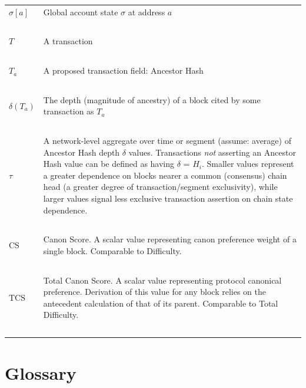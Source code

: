 \documentclass[11pt]{article}
\theoremstyle{plain}
\begin{document}
\begin{table}[H]
{\begin{tabular}{|p{5cm}|p{9cm}|}
$\sigma[a]$ & Global account state $\sigma$ at address $a$ \\~\\

$T$ & A transaction \\~\\

$T_a$ & A proposed transaction field: Ancestor Hash \\~\\

$\delta(T_a)$ & The depth (magnitude of ancestry) of a block cited by some
transaction as $T_a$ \\~\\

$\tau$ & A network-level aggregate over time or segment (assume: average) of
Ancestor Hash depth $\delta$ values. Transactions \textit{not} asserting an
Ancestor Hash value can be defined as having $\delta$ = $H_i$.
Smaller values represent a greater dependence on blocks nearer a common
(consensus) chain head (a greater degree of transaction/segment exclusivity),
while larger values signal less exclusive transaction assertion on chain
state dependence.
\\~\\

$\mathrm{CS}$ & Canon Score. A scalar value representing canon preference
weight of a single block. Comparable to Difficulty. \\~\\

$\mathrm{TCS}$ & Total Canon Score. A scalar value representing protocol
canonical preference. Derivation of this value for any block relies on the
antecedent calculation of that of its parent. Comparable to Total Difficulty.
\\~\\

\hline
\end{tabular}
}
\end{table}


\section{\normalsize{Glossary}}\label{sec: glossary}
\end{document}
